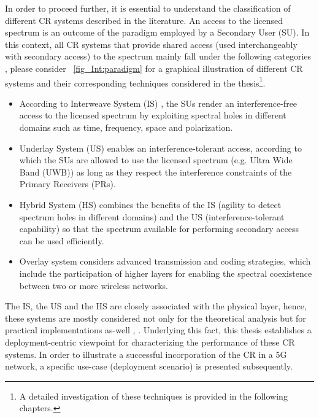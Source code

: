 In order to proceed further, it is essential to understand the classification of different CR systems described in the literature. An access to the licensed spectrum is an outcome of the paradigm employed by a Secondary User (SU). In this context, all CR systems that provide shared access (used interchangeably with secondary access) to the spectrum mainly fall under the following categories \cite{Goldsmith09}, please consider \figurename~\ref{fig_Int:paradigm} for a graphical illustration of different CR systems and their corresponding techniques considered in the thesis\footnote{A detailed investigation of these techniques is provided in the following chapters.}. 
\begin{itemize}
\item According to Interweave System (IS) , the SUs render an interference-free access to the licensed spectrum by exploiting spectral holes in different domains such as time, frequency, space and polarization. 
\item Underlay System (US)  enables an interference-tolerant access, according to which the SUs are allowed to use the licensed spectrum (e.g. Ultra Wide Band (UWB)) as long as they respect the interference constraints of the Primary Receivers (PRs). 
\item Hybrid System (HS)  combines the benefits of the IS (agility to detect spectrum holes in different domains) and the US (interference-tolerant capability) so that the spectrum available for performing secondary access can be used efficiently.  
\item Overlay system  considers advanced transmission and coding strategies, which include the participation of higher layers for enabling the spectral coexistence between two or more wireless networks. 
\end{itemize}
The IS, the US and the HS are closely associated with the physical layer, hence, these systems are mostly considered not only for the theoretical analysis but for practical implementations as-well , \cite{Cabric04, Cabric06, Kim10}. 
Underlying this fact, this thesis establishes a deployment-centric viewpoint for characterizing the performance of these CR systems. In order to illustrate a successful incorporation of the CR in a 5G network, a specific use-case (deployment scenario) is presented subsequently. 


